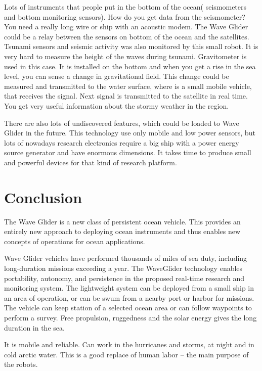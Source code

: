 Lots of instruments that people put in the bottom of the ocean( seismometers and bottom monitoring sensors). How do you get data from the seismometer?  You need a really long wire or ship with an acoustic modem. The Wave Glider could be a relay between the sensors on bottom of  the ocean and the satellites.  Tsunami sensors and seismic activity was also monitored by this small robot. It is very hard to measure the height of the waves during tsunami. Gravitometer is used in this case. It is  installed on the bottom and when you get a rise in the sea level, you can sense a change in gravitational field. This change could be measured and transmitted to the water surface, where  is a small  mobile vehicle, that receives the signal.  Next signal is transmitted to the satellite  in real time. You get very useful information about the stormy weather in the region.

There are also lots of undiscovered  features, which could be loaded to Wave Glider in the future. This technology  use only mobile and low power sensors, but lots of nowadays research electronics require a big ship with a power energy source generator and have enormous dimensions. It takes time to produce small and powerful devices for that kind of research platform.

\section{Conclusion}

The Wave Glider is a new class of persistent ocean vehicle. This provides an entirely new approach to deploying ocean instruments and thus enables new concepts of operations for ocean applications.

Wave Glider vehicles have performed thousands of miles of sea duty, including long-duration missions exceeding a year.   The WaveGlider technology enables portability, autonomy, and persistence in the proposed real-time research and monitoring system. The lightweight system can be deployed from a small ship in an area of operation, or can be swum from a nearby port or harbor for missions. The vehicle can keep station of a selected ocean area or can follow waypoints to perform a survey. Free propulsion, ruggedness and the solar energy gives  the long duration in the sea.
 
It is mobile and reliable. Can work in the hurricanes and storms, at night and in cold arctic water. This is a good replace of human labor – the main purpose of the robots.











